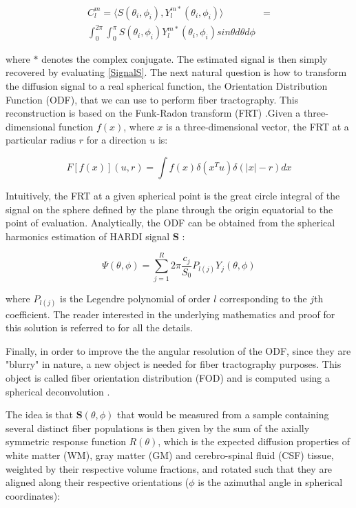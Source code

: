 \documentclass{cys}
\begin{document}
\begin{equation}
\begin{split}
C_l^m = \langle S(\theta_i,\phi_i),Y_l^{m\ast}(\theta_i,\phi_i) \rangle &= \\ \int_0^{2\pi} \int_0^\pi S(\theta_i,\phi_i)Y_l^{m\ast}(\theta_i,\phi_i) sin \theta d\theta d\phi
\end{split}
\end{equation}

where $\ast$ denotes  the  complex conjugate. The estimated signal is then simply recovered by evaluating \ref{SignalS}. The next natural question is how to transform the diffusion signal to a real spherical function, the Orientation Distribution Function (ODF), that we can use to perform fiber tractography. This reconstruction is based on the Funk-Radon transform (FRT) \cite{funk1915geometrische}.Given a three-dimensional function $f(x)$, where $x$ is a three-dimensional vector, the FRT at a particular radius $r$ for a direction $u$ is:

\begin{equation}
F[f(x)](u,r)=\int f(x)\delta(x^T u)\delta(|x|-r)dx
\end{equation} 

Intuitively, the FRT at a given spherical point is the great circle integral of the signal on the sphere defined by the plane through the origin equatorial to the point of evaluation. Analytically, the ODF can be obtained from the spherical harmonics estimation of HARDI signal $\mathbf{S}$ \cite{descoteaux2007regularized, hess2006q, anderson2005measurement}:


\begin{equation}
\Psi(\theta,\phi)=\sum_{j=1}^R 2\pi\frac{c_j}{S_0}P_{l(j)}Y_j(\theta,\phi)
\end{equation}

where $P_{l(j)}$ is the Legendre polynomial of order $l$ corresponding to the $j$th coefficient. The reader interested in the underlying mathematics and proof for this solution is referred to \cite{descoteaux2008high} for all the details. 

\bigskip
Finally, in order to improve the the angular resolution of the ODF, since they are "blurry" in nature, a new object is needed for fiber tractography purposes. This object is called fiber orientation distribution (FOD) and is computed using a spherical deconvolution \cite{tournier2004direct}.  

\bigskip
The idea is that $\mathbf{S}(\theta,\phi)$  that would be measured from a sample containing several distinct fiber populations is then given by the
sum of the axially symmetric response function $R(\theta)$, which is the expected diffusion properties of white matter (WM), gray matter (GM) and cerebro-spinal fluid (CSF) tissue, weighted by their respective volume fractions, and rotated such that they are aligned along their respective orientations ($\phi$ is the azimuthal angle in spherical coordinates):
\end{document}
